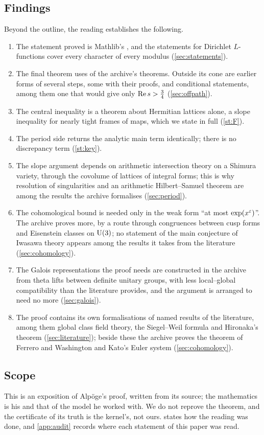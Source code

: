 \subsection{Findings}
Beyond the outline, the reading establishes the following.
\begin{enumerate}[label=(\roman*)]
\item The statement proved is Mathlib's , and the statements for
  Dirichlet $L$-functions cover every character of every modulus (\cref{sec:statements}).
\item The final theorem uses \coneprojtheorems{} of the archive's \projtheorems{} theorems.
  Outside its cone are earlier forms of several steps, some with their proofs, and conditional
  statements, among them one that would give only $\operatorname{Re} s>\tfrac34$ (\cref{sec:offpath}).
\item The central inequality is a theorem about Hermitian lattices alone, a slope inequality
  for nearly tight frames of maps, which we state in full (\cref{st:F}).
\item The period side returns the analytic main term identically; there is no discrepancy term
  (\cref{st:key}).
\item The slope argument depends on arithmetic intersection theory on a Shimura variety,
  through the covolume of lattices of integral forms; this is why resolution of singularities
  and an arithmetic Hilbert--Samuel theorem are among the results the archive formalises
  (\cref{sec:period}).
\item The cohomological bound is needed only in the weak form ``at most $\exp(x^\varepsilon)$''. The
  archive proves more, by a route through congruences between cusp forms and Eisenstein
  classes on $\mathrm{U}(3)$; no statement of the main conjecture of Iwasawa theory appears among the
  results it takes from the literature (\cref{sec:cohomology}).
\item The Galois representations the proof needs are constructed in the archive from theta
  lifts between definite unitary groups, with less local--global compatibility than the
  literature provides, and the argument is arranged to need no more (\cref{sec:galois}).
\item The proof contains its own formalisations of \rowspublished{} named results of the
  literature, among them global class field theory, the Siegel--Weil formula and Hironaka's
  theorem (\cref{sec:literature}); beside these the archive proves the theorem of Ferrero and
  Washington and Kato's Euler system (\cref{sec:cohomology}).
\end{enumerate}

\subsection{Scope}
This is an exposition of Alp\"oge's proof, written from its source; the mathematics is his and
that of the model he worked with. We do not reprove the theorem, and the certificate of its
truth is the kernel's, not ours.  states how the reading was done, and
\cref{app:audit} records where each statement of this paper was read.
